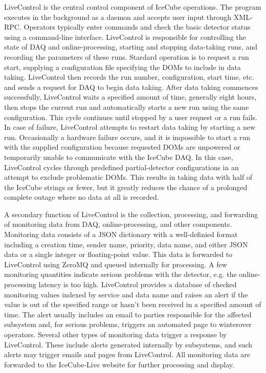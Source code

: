 LiveControl is the central control component of IceCube operations.  The program executes in the background as a daemon and accepts user input
through XML-RPC.  Operators typically enter commands and check the basic detector status using a command-line interface.  LiveControl is
responsible for controlling the state of DAQ and online-processing, starting and stopping data-taking runs, and recording
the parameters of these runs.  Stardard operation is to request a run start, supplying a configuration file specifying the DOMs to include in
data taking.  LiveControl then records the run number, configuration, start time, etc. and sends a request for DAQ to
begin data taking.  After data taking commences successfully, LiveControl waits a specified amount of time, generally eight
hours, then stops the current run and automatically starts a new run using the same configuration.  This cycle continues until
stopped by a user request or a run fails.  In case of failure, LiveControl attempts to restart data taking by starting a new
run.  Occasionally a hardware failure occurs, and it is impossible to start a run with the supplied configuration because requested DOMs are
unpowered or temporarily unable to communicate with the IceCube DAQ.  In this case, LiveControl cycles through predefined partial-detector
configurations in an attempt to exclude problematic DOMs.  This results in taking data with half of the IceCube strings or fewer, but it
greatly reduces the chance of a prolonged complete outage where no data at all is recorded.

A secondary function of LiveControl is the collection, processing, and forwarding of monitoring data from DAQ, online-processing, and other components.
Monitoring data consists of a JSON dictionary with a well-definied format including a creation time, sender name, priority, data name, and either JSON data
or a single integer or floating-point value.  This data is forwarded to LiveControl using ZeroMQ and queued internally for processing.  A few monitoring
quantities indicate serious problems with the detector, e.g. the online-processing latency is too high.  LiveControl provides a database of checked monitoring
values indexed by service and data name and raises an alert if the value is out of the specified range or hasn't been received in a specified amount of time.
The alert usually includes an email to parties responsible for the affected subsystem and, for serious problems, triggers an automated page to winterover operators.
Several other types of monitoring data trigger a response by LiveControl.  These include alerts generated internally by subsystems, and such alerts may trigger emails
and pages from LiveControl.  All monitoring data are forwarded to the IceCube-Live website for further processing and display.


